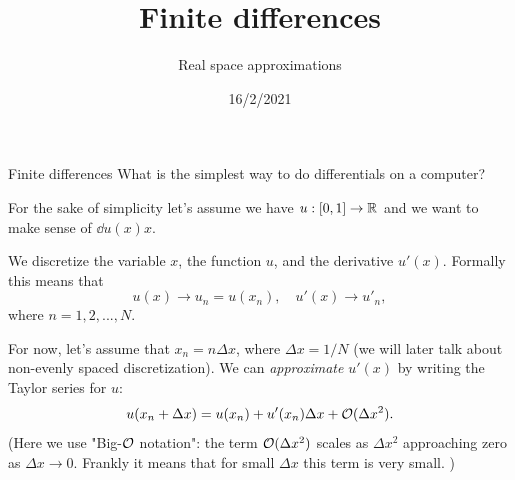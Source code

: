 

\title{Finite differences}
\subtitle{Real space approximations}
\date{16/2/2021}
\date{}


	
	\maketitle
	



\begin{frame}{Finite differences}
	What is the simplest way to do differentials on a computer? 
		
	\pause
	For the sake of simplicity let's assume we have $ u:[0,1] \to \mathbb{R} $ and we want to make sense of $ \dd{u(x)}{x} $.
	
	\pause
	We \alert{discretize} the variable $ x $, the function $ u $, and the derivative $ u'(x) $. Formally this means that 
	\[ u(x) \to u_n = u(x_n), \quad u'(x) \to u'_n,\]
	where $ n=1,2,...,N. $
	
	\pause
	For now, let's assume that $ x_n = n \Delta x $, where $ \Delta x = 1/N $ (we will later talk about non-evenly spaced discretization). We can \emph{approximate} $ u'(x) $ by writing the Taylor series for $ u $:
	\[ u(x_n + \Delta x) = u(x_n) + u'(x_n) \Delta x + \mathcal{O}(\Delta x^2).  \]
 	(Here we use "Big-$ \mathcal{O} $ notation": the term $ \mathcal{O} (\Delta x^2) $ scales as $ \Delta x^2 $ approaching zero as $ \Delta x \to 0 $. Frankly it means that for small $ \Delta x $ this term is very small. ) 
\end{frame}

